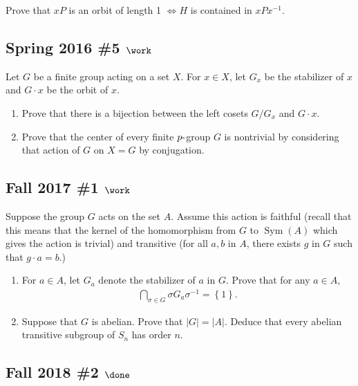 Prove that \(xP\) is an orbit of length 1 \(\iff H\) is contained in
\(xPx^{-1}\).

\hypertarget{spring-2016-5-work}{%
\subsection{\texorpdfstring{Spring 2016 \#5
\(\work\)}{Spring 2016 \#5 \textbackslash work}}\label{spring-2016-5-work}}

Let \(G\) be a finite group acting on a set \(X\). For \(x\in X\), let
\(G_x\) be the stabilizer of \(x\) and \(G\cdot x\) be the orbit of
\(x\).

\begin{enumerate}
\def\labelenumi{\alph{enumi}.}
\item
  Prove that there is a bijection between the left cosets \(G/G_x\) and
  \(G\cdot x\).
\item
  Prove that the center of every finite \(p{\hbox{-}}\)group \(G\) is
  nontrivial by considering that action of \(G\) on \(X=G\) by
  conjugation.
\end{enumerate}

\hypertarget{fall-2017-1-work}{%
\subsection{\texorpdfstring{Fall 2017 \#1
\(\work\)}{Fall 2017 \#1 \textbackslash work}}\label{fall-2017-1-work}}

Suppose the group \(G\) acts on the set \(A\). Assume this action is
faithful (recall that this means that the kernel of the homomorphism
from \(G\) to \(\operatorname{Sym}(A)\) which gives the action is
trivial) and transitive (for all \(a, b\) in \(A\), there exists \(g\)
in \(G\) such that \(g \cdot a = b\).)

\begin{enumerate}
\def\labelenumi{\alph{enumi}.}
\item
  For \(a \in A\), let \(G_a\) denote the stabilizer of \(a\) in \(G\).
  Prove that for any \(a \in A\),
  \begin{align*}
  \displaystyle\bigcap_{\sigma\in G} \sigma G_a \sigma^{-1}= \left\{{1}\right\}
  .\end{align*}
\item
  Suppose that \(G\) is abelian. Prove that \(|G| = |A|\). Deduce that
  every abelian transitive subgroup of \(S_n\) has order \(n\).
\end{enumerate}

\hypertarget{fall-2018-2-done}{%
\subsection{\texorpdfstring{Fall 2018 \#2
\(\done\)}{Fall 2018 \#2 \textbackslash done}}\label{fall-2018-2-done}}

